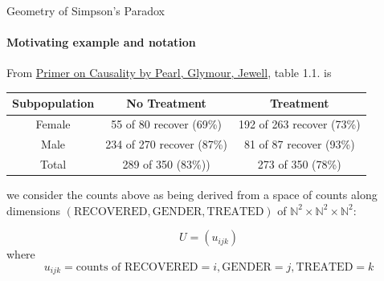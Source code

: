 \begin{frame}{Geometry of Simpson's Paradox}
  \framesubtitle{Motivating example and notation}
  From \href{http://bayes.cs.ucla.edu/PRIMER/primer-ch1.pdf}{Primer on Causality by Pearl, Glymour, Jewell}, table 1.1. is

  \begin{center}
    \begin{tabular}{ |c|c|c| }
    \hline
    Subpopulation & No Treatment & Treatment \\
    \hline
    Female & 55 of 80 recover (69\%) & 192 of 263 recover (73\%) \\
    Male & 234 of 270 recover (87\%) & 81 of 87 recover (93\%) \\
    Total & 289 of 350 (83\%)) & 273 of 350 (78\%) \\
    \hline
    \end{tabular}
  \end{center}
  we consider the counts above as being derived from a space of counts along dimensions $(\mathrm{RECOVERED}, \mathrm{GENDER}, \mathrm{TREATED})$ of $\mathbb{N}^2 \times \mathbb{N}^2  \times \mathbb{N}^2$:

  \begin{equation*}
    U = (u_{ijk})
  \end{equation*}
  where
  \begin{equation*}
    u_{ijk} = \textrm{counts of } \mathrm{RECOVERED} = i, \mathrm{GENDER} = j, \mathrm{TREATED} = k
  \end{equation*}
\end{frame}

